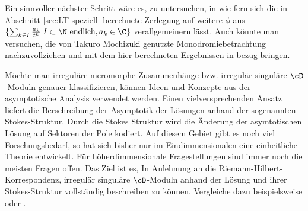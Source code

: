 \begin{comment}
Dies bestätigt die ohnehin bekannte Aussage, dass in unserem Beispiel keine
konvergente Zerlegung zu finden ist.
\end{comment}

\begin{comment}
Ein sinnvoller nächster Schritt wäre es, zu untersuchen, in wie fern sich die
in Abschnitt \ref{sec:LT-speziell} berechnete Zerlegung auf weitere $\phi$ aus
$\{\frac{a}{x^q}\mid a\in\C, q\in\N\}$ verallgemeinern lässt.
Eine nächste Verallgemeinerung wäre, ein $\phi$ $\in\{\sum_{k\in
I}\frac{a_k}{t^{k}}|I\subset\N\mbox{ endlich} ,a_k\in \C\}$ zu betrachten und
für dieses die Zerlegung von $\cM_\phi$ allgemein zu berechnen.

Auch könnte man versuchen, die von Takuro Mochizuki genutzte
Monodromiebetrachtung nachzuvollziehen und mit dem hier berechneten Ergebnissen
in bezug bringen.
\end{comment}
Ein sinnvoller nächster Schritt wäre es, zu untersuchen, in wie fern sich die
in Abschnitt \ref{sec:LT-speziell} berechnete Zerlegung auf weitere $\phi$ aus
$\{\sum_{k\in I}\frac{a_k}{t^{k}}|I\subset\N\mbox{ endlich} ,a_k\in \C\}$
verallgemeinern lässt.
Auch könnte man versuchen, die von Takuro Mochizuki genutzte
Monodromiebetrachtung nachzuvollziehen und mit dem hier berechneten Ergebnissen
in bezug bringen.

Möchte man irreguläre meromorphe Zusammenhänge bzw.  irregulär singuläre
$\cD$-Moduln genauer klassifizieren, können Ideen und Konzepte aus der
asymptotische Analysis verwendet werden.
Einen vielversprechenden Ansatz liefert die Berschreibung der Asymptotik der
Lösungen anhand der sogenannten \glqq{}Stokes-Struktur\grqq{}.
Durch die Stokes Struktur wird die Änderung der asymtotischen Lösung auf
Sektoren der Pole kodiert.
Auf diesem Gebiet gibt es noch viel Forschungsbedarf, so hat sich bisher nur im
Eindimmensionalen eine einheitliche Theorie entwickelt. Für höherdimmensionale
Fragestellungen sind immer noch die meisten Fragen offen.
Das Ziel ist es,
In Anlehnung an die Riemann-Hilbert-Korrespondenz, irregulär singuläre
$\cD$-Moduln anhand der Lösung und ihrer Stokes-Struktur vollständig
beschreiben zu können.
Vergleiche dazu beispielsweise \cite{sabbah2013introduction} oder
\cite{citeulike:8523004}.


